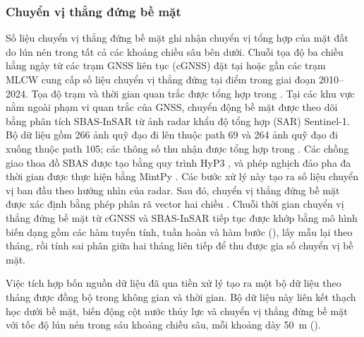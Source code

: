 \subsubsection{Chuyển vị thẳng đứng bề mặt}

Số liệu chuyển vị thẳng đứng bề mặt ghi nhận chuyển vị tổng hợp của mặt đất do lún nén trong tất cả các khoảng chiều sâu bên dưới. Chuỗi tọa độ ba chiều hằng ngày từ các trạm GNSS liên tục (cGNSS) đặt tại hoặc gần các trạm MLCW \citep{IESAS_TGM_2026} cung cấp số liệu chuyển vị thẳng đứng tại điểm trong giai đoạn 2010--2024. Tọa độ trạm và thời gian quan trắc được tổng hợp trong . Tại các khu vực nằm ngoài phạm vi quan trắc của GNSS, chuyển động bề mặt được theo dõi bằng phân tích SBAS-InSAR từ ảnh radar khẩu độ tổng hợp (SAR) Sentinel-1. Bộ dữ liệu gồm 266 ảnh quỹ đạo đi lên thuộc path 69 và 264 ảnh quỹ đạo đi xuống thuộc path 105; các thông số thu nhận được tổng hợp trong  \citep{torres_gmes_2012, yague-martinez_interferometric_2016}. Các chồng giao thoa đồ SBAS được tạo bằng quy trình HyP3 \citep{hogenson_hybrid_2025}, và phép nghịch đảo pha đa thời gian được thực hiện bằng MintPy \citep{yunjun_small_2019}. Các bước xử lý này tạo ra số liệu chuyển vị ban đầu theo hướng nhìn của radar. Sau đó, chuyển vị thẳng đứng bề mặt được xác định bằng phép phân rã vector hai chiều \citep{fuhrmann_resolving_2019, hanssen_radar_2001}. Chuỗi thời gian chuyển vị thẳng đứng bề mặt từ cGNSS và SBAS-InSAR tiếp tục được khớp bằng mô hình biến dạng gồm các hàm tuyến tính, tuần hoàn và hàm bước (), lấy mẫu lại theo tháng, rồi tính sai phân giữa hai tháng liên tiếp để thu được gia số chuyển vị bề mặt.

Việc tích hợp bốn nguồn dữ liệu đã qua tiền xử lý tạo ra một bộ dữ liệu theo tháng được đồng bộ trong không gian và thời gian. Bộ dữ liệu này liên kết thạch học dưới bề mặt, biến động cột nước thủy lực và chuyển vị thẳng đứng bề mặt với tốc độ lún nén trong sáu khoảng chiều sâu, mỗi khoảng dày 50~m ().


